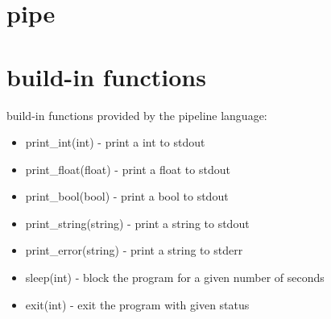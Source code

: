 \documentclass[./Report_main.tex]{subfiles}
\begin{document}
\section{pipe}
\section{build-in functions}
build-in functions provided by the pipeline language:\\
\begin{itemize}
    \item print\_int(int) - print a int to stdout
    \item print\_float(float) - print a float to stdout
    \item print\_bool(bool) - print a bool to stdout
    \item print\_string(string) - print a string to stdout
    \item print\_error(string) - print a string to stderr
    \item sleep(int) - block the program for a given number of seconds
    \item exit(int) - exit the program with given status
\end{itemize}
\end{document}
